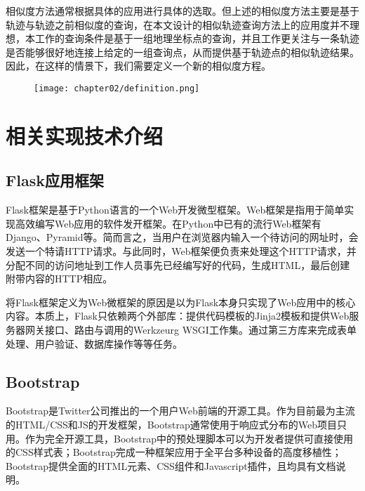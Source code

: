 相似度方法通常根据具体的应用进行具体的选取。但上述的相似度方法主要是基于轨迹与轨迹之前相似度的查询，在本文设计的相似轨迹查询方法上的应用度并不理想，本工作的查询条件是基于一组地理坐标点的查询，并且工作更关注与一条轨迹是否能够很好地连接上给定的一组查询点，从而提供基于轨迹点的相似轨迹结果。因此，在这样的情景下，我们需要定义一个新的相似度方程。

\begin{figure}[!htp]
  \centering
  \texttt{[image: chapter02/definition.png]}
\end{figure}

\section{相关实现技术介绍}
\label{sec:technology}

\subsection{Flask应用框架}
\label{subsec:flask}
Flask框架是基于Python语言的一个Web开发微型框架。Web框架是指用于简单实现高效编写Web应用的软件发开框架。在Python中已有的流行Web框架有Django、Pyramid等。简而言之，当用户在浏览器内输入一个待访问的网址时，会发送一个特请HTTP请求。与此同时，Web框架便负责来处理这个HTTP请求，并分配不同的访问地址到工作人员事先已经编写好的代码，生成HTML，最后创建附带内容的HTTP相应。

将Flask框架定义为Web微框架的原因是以为Flask本身只实现了Web应用中的核心内容。本质上，Flask只依赖两个外部库：提供代码模板的Jinja2模板和提供Web服务器网关接口、路由与调用的Werkzeurg WSGI工作集\cite{flasklibrary}。通过第三方库来完成表单处理、用户验证、数据库操作等等任务。

\subsection{Bootstrap}
\label{subsec:bootstrap}
Bootstrap是Twitter公司推出的一个用户Web前端的开源工具。作为目前最为主流的HTML/CSS和JS的开发框架，Bootstrap通常使用于响应式分布的Web项目只用。作为完全开源工具，Bootstrap中的预处理脚本可以为开发者提供可直接使用的CSS样式表；Bootstrap完成一种框架应用于全平台多种设备的高度移植性；Bootstrap提供全面的HTML元素、CSS组件和Javascript插件，且均具有文档说明。


